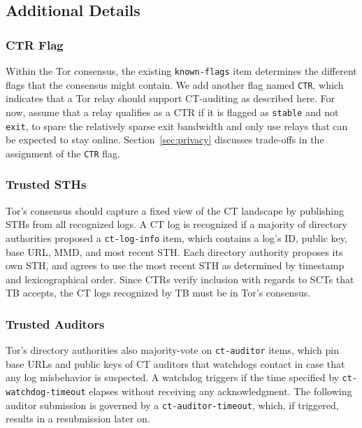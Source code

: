 \subsection{Additional Details} \label{sec:base:consensus}

\subsubsection{CTR Flag} \label{sec:base:consensus:ctr-flag}
Within the Tor consensus, the existing \texttt{known-flags} item determines the
different flags that the consensus might contain.  We add another flag named
\texttt{CTR}, which indicates that a Tor relay should support CT-auditing as
described here. For now, assume that a relay qualifies as a CTR if it is flagged
as \texttt{stable} and not \texttt{exit}, to spare the relatively sparse exit
bandwidth and only use relays that can be expected to stay online.
Section~\ref{sec:privacy} discusses trade-offs in the assignment of the
\texttt{CTR} flag.

\subsubsection{Trusted STHs}
Tor's consensus should capture a fixed view of the CT landscape by publishing
STHs from all recognized logs.  A CT log is recognized if a majority of directory
authorities proposed a \texttt{ct-log-info} item, which contains a log's ID,
public key, base URL, MMD, and most recent STH.  Each directory authority
proposes its own STH, and agrees to use the most recent STH as determined by
timestamp and lexicographical order.  Since CTRs verify inclusion with regards
to SCTs that TB accepts, the CT logs recognized by TB must be
in Tor's consensus.

\subsubsection{Trusted Auditors}
Tor's directory authorities also majority-vote on \texttt{ct-auditor} items,
which pin base URLs and public keys of CT auditors that watchdogs contact in
case that any log misbehavior is suspected.  A watchdog triggers if the time
specified by \texttt{ct-watchdog-timeout} elapses without receiving any
acknowledgment.  The following auditor submission is governed by a
\texttt{ct-auditor-timeout}, which, if triggered, results in a resubmission
later on.

